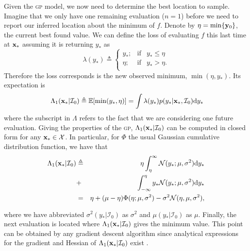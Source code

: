 \documentclass[twoside]{article}
\newcommand{\I}{\mathcal{I}}
\newcommand{\ud}{\mathrm{d}}
\newcommand{\E}{\mathbb{E}}
\newcommand{\acr}[1]{\textsc{#1}\xspace}
\newcommand{\gp}{\acr{gp}}
\begin{document}
Given the \gp model, we now need to determine the best location to sample. Imagine that we only have one remaining evaluation ($n=1$) before we need to report our inferred location about the minimum of $f$. Denote by $\eta = \min \{\mathbf{y}_0\}$, the current best found value. We can define the loss of evaluating $f$ this last time at $\mathbf{x}_*$ assuming it is returning $y_*$ as
$$\lambda(y_*)\triangleq \left\{ \begin{array}{lcl}
y_*;             & \mbox{if}  &  y_* \leq \eta \\
 \eta; & \mbox{if}  & y_* > \eta. \\
\end{array}
\right.$$
Therefore the loss corresponds is the new observed minimum, $\min (\eta,y_*)$. Its expectation is 
$$\ \Lambda_1(\latentVector_*| \I_0) \triangleq \E[ \min (y_*,\eta)]= \int \lambda(y_*)p(y_* |\latentVector_*,\I_0)\ud y_*$$
where the subscript in $\Lambda$ refers to the fact that we are considering one future evaluation.  Giving the properties of the \gp, $\Lambda_1(\latentVector_*| \I_0)$ can be computed in closed form for any $\mathbf{x}_* \in \mathcal{X}$. In particular, for $\Phi$ the usual Gaussian cumulative distribution function, we have that
\begin{eqnarray}\label{eq:expected_myopic_loss}
\Lambda_1(\latentVector_*| \I_0) &  \triangleq & \eta \int_{\eta}^{\infty} \mathcal{N}(y_*;\mu,\sigma^2) \ud y_* \\ \nonumber
& +  & \int_{-\infty}^{\eta} y_* \mathcal{N}(y_*;\mu,\sigma^2) \ud y_*  \\ \nonumber
& = &  \eta +(\mu  - \eta) \Phi (\eta ; \mu, \sigma^2) - \sigma^2 \mathcal{N} (\eta, \mu, \sigma^2), \nonumber
\end{eqnarray}

where we have abbreviated $\sigma^2(y_*|\I_0)$ as $\sigma^2$ and $\mu(y_{*}|\I_0)$ as $\mu$. Finally, the next evaluation is located   where $\Lambda_1(\latentVector_*| \I_0) $ gives the minimum value. This point can  be obtained by any gradient descent algorithm since analytical expressions for the gradient and Hessian of $\Lambda_1(\latentVector_*| \I_0)$  exist \citep{osborne_bayesian_2010}. 




\end{document}
